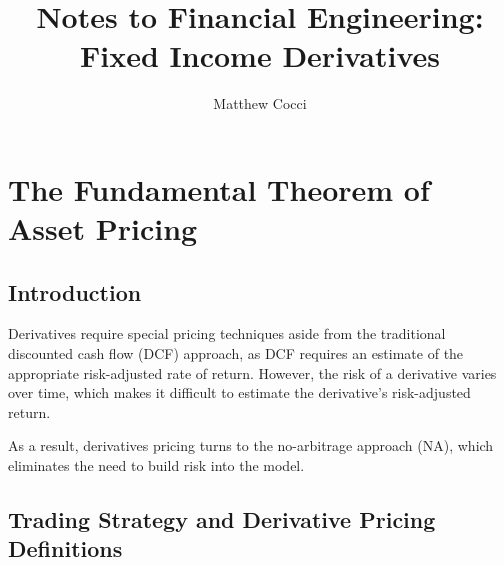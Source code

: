 \documentclass[a4paper,12pt]{scrartcl}
\author{Matthew Cocci}
\title{Notes to Financial Engineering: \\Fixed Income Derivatives}
\date{}
\begin{document}
\maketitle

\tableofcontents

\newpage
\section{The Fundamental Theorem of Asset Pricing}

\subsection{Introduction}

Derivatives require special pricing techniques aside from the traditional
discounted cash flow (DCF) approach, as DCF requires an estimate of the
appropriate risk-adjusted rate of return.  However, the risk of a 
derivative varies over time, which makes it difficult to estimate the
derivative's risk-adjusted return.

As a result, derivatives pricing turns to the no-arbitrage approach (NA),
which eliminates the need to build risk into the model.  

\subsection{Trading Strategy and Derivative Pricing Definitions}
\end{document}
